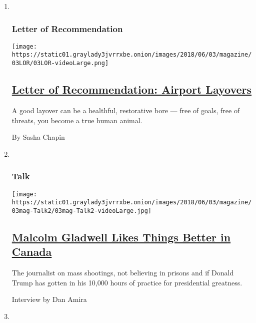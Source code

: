 \begin{enumerate}
\def\labelenumi{\arabic{enumi}.}
\item ~
  \hypertarget{letter-of-recommendation}{%
  \subsubsection{Letter of
  Recommendation}\label{letter-of-recommendation}}

  \texttt{[image: https://static01.graylady3jvrrxbe.onion/images/2018/06/03/magazine/03LOR/03LOR-videoLarge.png]}

  \hypertarget{letter-of-recommendation-airport-layovers}{%
  \subsection{\texorpdfstring{\href{/2018/05/29/magazine/letter-of-recommendation-airport-layovers.html}{Letter
  of Recommendation: Airport
  Layovers}}{Letter of Recommendation: Airport Layovers}}\label{letter-of-recommendation-airport-layovers}}

  A good layover can be a healthful, restorative bore --- free of goals,
  free of threats, you become a true human animal.

  By Sasha Chapin
\item ~
  \hypertarget{talk}{%
  \subsubsection{Talk}\label{talk}}

  \texttt{[image: https://static01.graylady3jvrrxbe.onion/images/2018/06/03/magazine/03mag-Talk2/03mag-Talk2-videoLarge.jpg]}

  \hypertarget{malcolm-gladwell-likes-things-better-in-canada}{%
  \subsection{\texorpdfstring{\href{/2018/05/29/magazine/malcolm-gladwell-likes-things-better-in-canada.html}{Malcolm
  Gladwell Likes Things Better in
  Canada}}{Malcolm Gladwell Likes Things Better in Canada}}\label{malcolm-gladwell-likes-things-better-in-canada}}

  The journalist on mass shootings, not believing in prisons and if
  Donald Trump has gotten in his 10,000 hours of practice for
  presidential greatness.

  Interview by Dan Amira
\item ~
  \hypertarget{new-sentences}{%
}
\end{enumerate}
